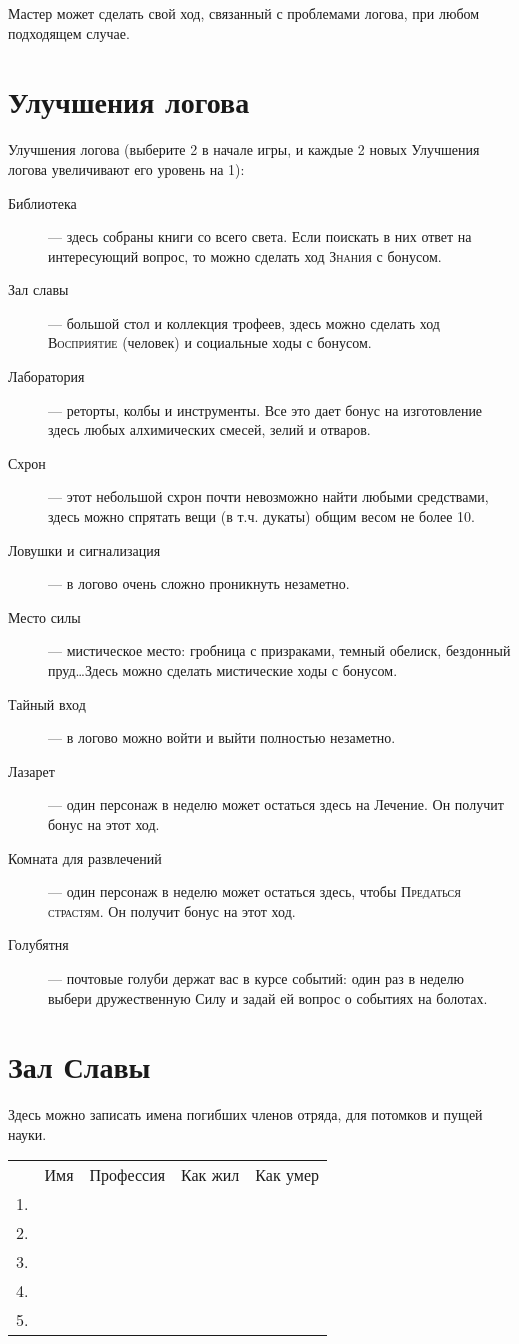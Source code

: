 \documentclass[10pt,twoside]{report}
\begin{document}
Мастер может сделать свой
ход, связанный с проблемами логова, при любом подходящем случае.
\vfill
\pagebreak


\section*{Улучшения логова}

Улучшения логова (выберите 2 в начале игры, и каждые 2 новых Улучшения
логова увеличивают его уровень на 1):
\begin{description}
  \item[Библиотека]--- здесь собраны книги со всего света. Если
    поискать в них ответ на интересующий вопрос, то можно сделать ход
    \textsc{Знания} с бонусом.
  \item[Зал славы]--- большой стол и коллекция трофеев, здесь можно
    сделать ход \textsc{Восприятие} (человек) и социальные ходы с бонусом.
  \item[Лаборатория]--- реторты, колбы и инструменты. Все это дает
    бонус на изготовление здесь любых алхимических смесей, зелий и
    отваров.
  \item[Схрон]--- этот небольшой схрон почти невозможно найти любыми
    средствами, здесь можно спрятать вещи (в т.ч. дукаты) общим весом
    не более 10.
  \item[Ловушки и сигнализация]--- в логово очень сложно проникнуть
    незаметно.
  \item[Место силы]--- мистическое место: гробница с призраками,
    темный обелиск, бездонный пруд\ldots Здесь можно сделать
    мистические ходы с бонусом.
  \item[Тайный вход]--- в логово можно войти и выйти полностью
    незаметно.
  \item[Лазарет]--- один персонаж в неделю может остаться здесь на
    Лечение. Он получит бонус на этот ход.
  \item[Комната для развлечений]--- один персонаж в неделю может
    остаться здесь, чтобы \textsc{Предаться страстям}. Он получит бонус на этот
    ход.
  \item[Голубятня]--- почтовые голуби держат вас в курсе событий: один
    раз в неделю выбери дружественную Силу и задай ей вопрос о
    событиях на болотах.
\end{description}
\vfill
\pagebreak

\section*{Зал Славы}
Здесь можно записать имена погибших членов отряда, для потомков и
пущей науки.

\begin{tabular}{p{0.5cm} l l l l}
  &Имя&Профессия&Как жил&Как умер \\
  1.&&&& \\
  2.&&&& \\
  3.&&&& \\
  4.&&&& \\
  5.&&&& \\
  
\end{tabular}
\end{document}

